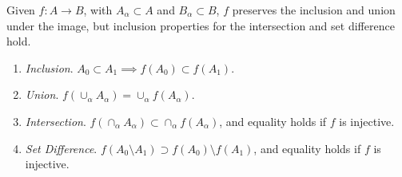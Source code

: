   \begin{theorem}
    Given $f: A \rightarrow B$, with $A_\alpha \subset A$ and $B_\alpha \subset B$, $f$ preserves the inclusion and union under the image, but inclusion properties for the intersection and set difference hold. 
    \begin{enumerate}
      \item \textit{Inclusion}. $A_0 \subset A_1 \implies f(A_0) \subset f(A_1)$. 
      \item \textit{Union}. $f(\cup_\alpha A_\alpha) = \cup_\alpha f(A_\alpha)$. 
      \item \textit{Intersection}. $f(\cap_\alpha A_\alpha) \subset \cap_\alpha f(A_\alpha)$, and equality holds if $f$ is injective. 
      \item \textit{Set Difference}. $f(A_0 \setminus A_1) \supset f(A_0) \setminus f(A_1)$, and equality holds if $f$ is injective. 
    \end{enumerate}
  \end{theorem} 
